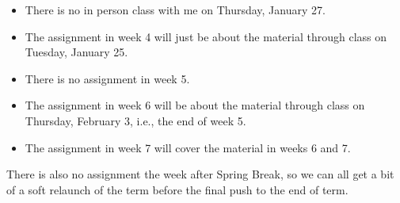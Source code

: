 \documentclass[
]{article}
\providecommand{\tightlist}{%
  \setlength{\itemsep}{0pt}\setlength{\parskip}{0pt}}\usepackage{longtable,booktabs,array}
\begin{document}
\begin{itemize}
\tightlist
\item
  There is no in person class with me on Thursday, January 27.
\item
  The assignment in week 4 will just be about the material through class
  on Tuesday, January 25.
\item
  There is no assignment in week 5.
\item
  The assignment in week 6 will be about the material through class on
  Thursday, February 3, i.e., the end of week 5.
\item
  The assignment in week 7 will cover the material in weeks 6 and 7.
\end{itemize}

There is also no assignment the week after Spring Break, so we can all
get a bit of a soft relaunch of the term before the final push to the
end of term.

\newpage
\end{document}
